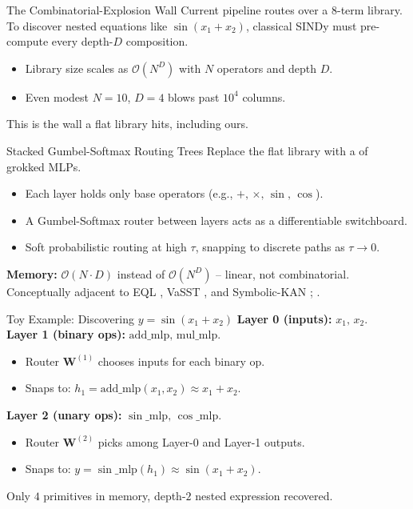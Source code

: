 \documentclass[
11pt,notheorems,hyperref={pdfauthor=Aniruddha Pandey}
]{beamer}
\begin{document}
\begin{frame}{The Combinatorial-Explosion Wall}
Current pipeline routes over a  8-term library.\\[0.2cm]
To discover nested equations like $\sin(x_1 + x_2)$, classical SINDy must pre-compute every depth-$D$ composition.
\begin{itemize}
    \item Library size scales as $\mathcal{O}(N^D)$ with $N$ operators and depth $D$.
    \item Even modest $N{=}10$, $D{=}4$ blows past $10^4$ columns.
\end{itemize}
\vspace{0.2cm}
\alert{This is the wall a flat library hits, including ours.}
\end{frame}

\begin{frame}{Stacked Gumbel-Softmax Routing Trees}
Replace the flat library with a  of grokked MLPs.
\begin{itemize}
    \item Each layer holds only base operators (e.g., $+,\,\times,\,\sin,\,\cos$).
    \item A Gumbel-Softmax router \cite{b7} between layers acts as a differentiable switchboard.
    \item Soft probabilistic routing at high $\tau$, snapping to discrete paths as $\tau \to 0$.
\end{itemize}
\vspace{0.2cm}
\textbf{Memory:} $\mathcal{O}(N \cdot D)$ instead of $\mathcal{O}(N^D)$ -- linear, not combinatorial.\\[0.2cm]
Conceptually adjacent to EQL \cite{b8}, VaSST \cite{b9}, and Symbolic-KAN \cite{b10}; .
\end{frame}

\begin{frame}{Toy Example: Discovering $y = \sin(x_1 + x_2)$}
\textbf{Layer 0 (inputs):} $x_1,\, x_2$.\\[0.2cm]
\textbf{Layer 1 (binary ops):} $\mathrm{add\_mlp},\, \mathrm{mul\_mlp}$.
\begin{itemize}
    \item Router $\mathbf{W}^{(1)}$ chooses inputs for each binary op.
    \item Snaps to: $h_1 = \mathrm{add\_mlp}(x_1, x_2) \approx x_1 + x_2$.
\end{itemize}
\textbf{Layer 2 (unary ops):} $\sin\mathrm{\_mlp},\, \cos\mathrm{\_mlp}$.
\begin{itemize}
    \item Router $\mathbf{W}^{(2)}$ picks among Layer-0 and Layer-1 outputs.
    \item Snaps to: $y = \sin\mathrm{\_mlp}(h_1) \approx \sin(x_1 + x_2)$. \example{\checkmark}
\end{itemize}
\vspace{0.2cm}
Only $4$ primitives in memory, depth-$2$ nested expression recovered.
\end{frame}
\end{document}
